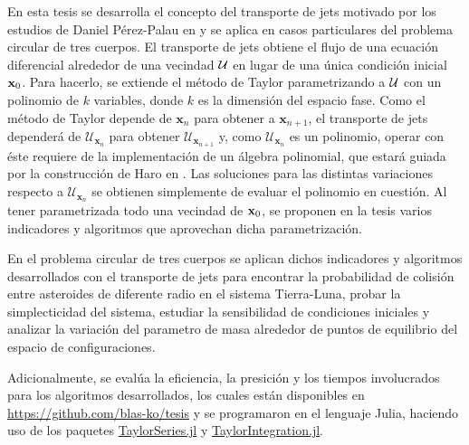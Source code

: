 En esta tesis se desarrolla el concepto del transporte de jets motivado por los estudios de Daniel Pérez-Palau en \cite{Perez2013, Perez2015} y se aplica en casos particulares del problema circular de tres cuerpos. El transporte de jets obtiene el flujo de una ecuación diferencial alrededor de una vecindad $\mathcal{U}$ en lugar de una única  condición inicial $\mathbf{x}_0$. Para hacerlo, se extiende el método de Taylor parametrizando a $\mathcal{U}$ con un polinomio de $k$ variables, donde $k$ es la dimensión del espacio fase. Como el método de Taylor depende de $\mathbf{x}_n$ para obtener a $\mathbf{x}_{n+1}$, el transporte de jets dependerá de $\mathcal{U}_{\mathbf{x}_n}$ para obtener $\mathcal{U}_{\mathbf{x}_{n+1}}$ y, como $\mathcal{U}_{\mathbf{x}_n}$ es un polinomio, operar con éste requiere de la implementación de un álgebra polinomial, que estará guiada por la construcción de Haro en \cite{Haro2009}. Las soluciones para las distintas variaciones respecto a $\mathcal{U}_{\mathbf{x}_n}$ se obtienen simplemente de evaluar el polinomio en cuestión. Al tener parametrizada todo una vecindad de $\mathbf{x}_0$, se proponen en la tesis varios indicadores y algoritmos que aprovechan dicha parametrización.

En el problema circular de tres cuerpos se aplican dichos indicadores y algoritmos desarrollados con el transporte de jets para encontrar la probabilidad de colisión entre asteroides de diferente radio en el sistema Tierra-Luna, probar la simplecticidad del sistema, estudiar la sensibilidad de condiciones iniciales y analizar la variación del parametro de masa alrededor de puntos de equilibrio del espacio de configuraciones.  

Adicionalmente, se evalúa la eficiencia, la presición y los tiempos involucrados para los algoritmos desarrollados, los cuales están disponibles en \href{https://github.com/blas-ko/tesis}{https://github.com/blas-ko/tesis} y se programaron en el lenguaje Julia, haciendo uso de los paquetes \href{}{TaylorSeries.jl} y \href{}{TaylorIntegration.jl}. 

